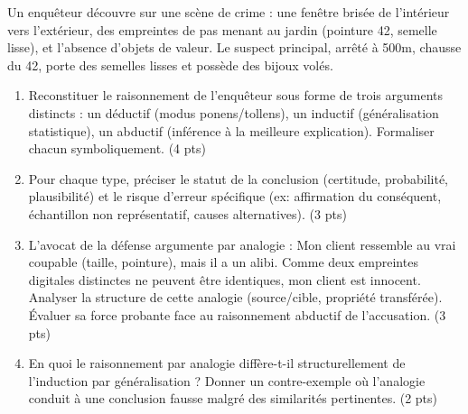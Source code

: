 \documentclass[11pt]{article}
\begin{document}
\begin{exercice}
Un enquêteur découvre sur une scène de crime : une fenêtre brisée de l'intérieur vers l'extérieur, des empreintes de pas menant au jardin (pointure 42, semelle lisse), et l'absence d'objets de valeur. Le suspect principal, arrêté à 500m, chausse du 42, porte des semelles lisses et possède des bijoux volés.
\begin{enumerate}
    \item Reconstituer le raisonnement de l'enquêteur sous forme de trois arguments distincts : un déductif (modus ponens/tollens), un inductif (généralisation statistique), un abductif (inférence à la meilleure explication). Formaliser chacun symboliquement. (4 pts)
    \item Pour chaque type, préciser le statut de la conclusion (certitude, probabilité, plausibilité) et le risque d'erreur spécifique (ex: affirmation du conséquent, échantillon non représentatif, causes alternatives). (3 pts)
    \item L'avocat de la défense argumente par analogie : \og Mon client ressemble au vrai coupable (taille, pointure), mais il a un alibi. Comme deux empreintes digitales distinctes ne peuvent être identiques, mon client est innocent. \fg{} Analyser la structure de cette analogie (source/cible, propriété transférée). Évaluer sa force probante face au raisonnement abductif de l'accusation. (3 pts)
    \item En quoi le raisonnement par analogie diffère-t-il structurellement de l'induction par généralisation ? Donner un contre-exemple où l'analogie conduit à une conclusion fausse malgré des similarités pertinentes. (2 pts)
\end{enumerate}
\end{exercice}
\vspace{8pt}
\end{document}
